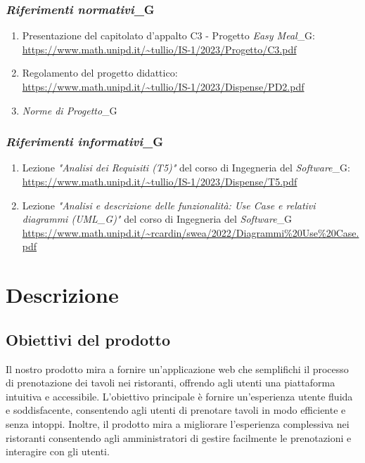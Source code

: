 \documentclass[12pt, oneside]{article}
\begin{document}
\subsubsection{\textit{Riferimenti normativi}_G}
\begin{enumerate}
    \item Presentazione del capitolato d'appalto C3 - Progetto \textit{Easy Meal}_G: \\ \url{https://www.math.unipd.it/~tullio/IS-1/2023/Progetto/C3.pdf}
    \item Regolamento del progetto didattico: \\ \url{https://www.math.unipd.it/~tullio/IS-1/2023/Dispense/PD2.pdf}
    \item \textit{Norme di Progetto}_G
\end{enumerate}
\subsubsection{\textit{Riferimenti informativi}_G}
\begin{enumerate}
    \item Lezione \emph{"Analisi dei Requisiti (T5)"} del corso di Ingegneria del \textit{Software}_G: \\ \url{https://www.math.unipd.it/~tullio/IS-1/2023/Dispense/T5.pdf}
    \item Lezione \emph{"Analisi e descrizione delle funzionalità: Use Case e relativi diagrammi (\textit{UML}_G)"} del corso di Ingegneria del \textit{Software}_G \\ \url{https://www.math.unipd.it/~rcardin/swea/2022/Diagrammi%20Use%20Case.pdf}
\end{enumerate}
\newpage

\section{Descrizione}
\subsection{Obiettivi del prodotto}
Il nostro prodotto mira a fornire un'applicazione web che semplifichi il processo di prenotazione dei tavoli nei ristoranti, offrendo agli utenti una piattaforma intuitiva e accessibile. L'obiettivo principale è fornire un'esperienza utente fluida e soddisfacente, consentendo agli utenti di prenotare tavoli in modo efficiente e senza intoppi. Inoltre, il prodotto mira a migliorare l'esperienza complessiva nei ristoranti consentendo agli amministratori di gestire facilmente le prenotazioni e interagire con gli utenti.
\end{document}
